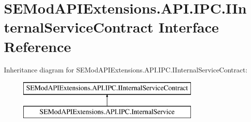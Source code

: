 \hypertarget{interface_s_e_mod_a_p_i_extensions_1_1_a_p_i_1_1_i_p_c_1_1_i_internal_service_contract}{}\section{S\+E\+Mod\+A\+P\+I\+Extensions.\+A\+P\+I.\+I\+P\+C.\+I\+Internal\+Service\+Contract Interface Reference}
\label{interface_s_e_mod_a_p_i_extensions_1_1_a_p_i_1_1_i_p_c_1_1_i_internal_service_contract}
Inheritance diagram for S\+E\+Mod\+A\+P\+I\+Extensions.\+A\+P\+I.\+I\+P\+C.\+I\+Internal\+Service\+Contract\+:\begin{figure}[H]
\begin{center}
\leavevmode
\includegraphics[height=2.000000cm]{interface_s_e_mod_a_p_i_extensions_1_1_a_p_i_1_1_i_p_c_1_1_i_internal_service_contract}
\end{center}
\end{figure}
